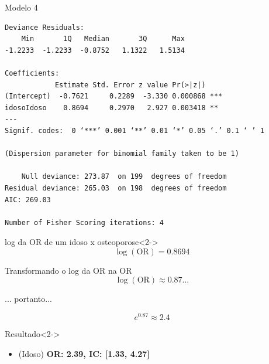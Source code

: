 \documentclass{beamer}
\begin{document}
\begin{frame}[fragile]{\scriptsize }
  \begin{center}
    \begin{exampleblock}{Modelo 4}
      \tiny
\begin{verbatim}
Deviance Residuals: 
    Min       1Q   Median       3Q      Max  
-1.2233  -1.2233  -0.8752   1.1322   1.5134  

Coefficients:
            Estimate Std. Error z value Pr(>|z|)    
(Intercept)  -0.7621     0.2289  -3.330 0.000868 ***
idosoIdoso    0.8694     0.2970   2.927 0.003418 ** 
---
Signif. codes:  0 ‘***’ 0.001 ‘**’ 0.01 ‘*’ 0.05 ‘.’ 0.1 ‘ ’ 1

(Dispersion parameter for binomial family taken to be 1)

    Null deviance: 273.87  on 199  degrees of freedom
Residual deviance: 265.03  on 198  degrees of freedom
AIC: 269.03

Number of Fisher Scoring iterations: 4
\end{verbatim}
    \end{exampleblock}
    \begin{block}{\small log da OR de um idoso x osteoporose}<2->
    \footnotesize
      $$\log \left(\text{OR} \right) = 0.8694$$
    \end{block}
  \end{center}
\end{frame}

\begin{frame}{\scriptsize }
  \begin{block}{\small Transformando o log da OR na OR }
    \footnotesize
    $$\log \left(\text{OR} \right) \approx 0.87...$$
    \begin{center}
      \small
      ... portanto...
    \end{center}
    \footnotesize
    $$e^{0.87} \approx 2.4$$
  \end{block}

  \bigskip
  \bigskip
  \begin{block}{Resultado}<2->
    \footnotesize
    \begin{itemize}
    \footnotesize
    \item (Idoso) {\bf OR: 2.39, IC: [1.33, 4.27]}
    \end{itemize}
  \end{block}
\end{frame}
\end{document}
